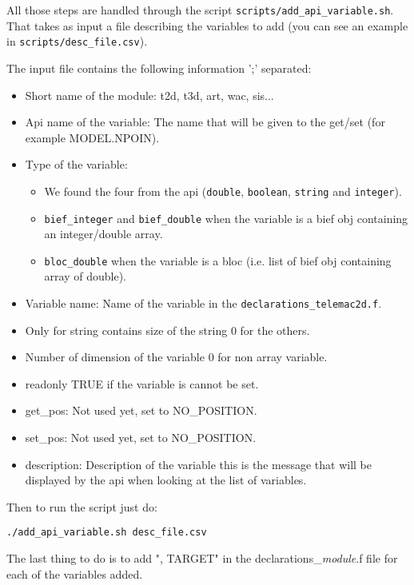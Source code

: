 All those steps are handled through the script
\verb!scripts/add_api_variable.sh!. That takes as input a file describing the
variables to add (you can see an example in \verb!scripts/desc_file.csv!).

The input file contains the following information ';' separated:
\begin{itemize}
  \item Short name of the module: t2d, t3d, art, wac, sis...
  \item Api name of the variable: The name that will be given to the get/set
    (for example MODEL.NPOIN).
  \item Type of the variable:
    \begin{itemize}
      \item We found the four from the api (\verb!double!, \verb!boolean!,
        \verb!string! and \verb!integer!).
      \item \verb!bief_integer! and \verb!bief_double! when the 
        variable is a bief obj containing an integer/double array.
      \item \verb!bloc_double! when the  variable is a bloc (i.e.
        list of bief obj containing array of double).
    \end{itemize}
  \item Variable \fortran name: Name of the variable in the
    \verb!declarations_telemac2d.f!.
  \item Only for string contains size of the string 0 for the others.
  \item Number of dimension of the variable 0 for non array variable.
  \item readonly TRUE if the variable is cannot be set.
  \item get\_pos: Not used yet, set to NO\_POSITION.
  \item set\_pos: Not used yet, set to NO\_POSITION.
  \item description: Description of the variable this is the message that will
    be displayed by the api when looking at the list of variables.
\end{itemize}

Then to run the script just do:
\begin{lstlisting}
./add_api_variable.sh desc_file.csv
\end{lstlisting}

The last thing to do is to add ", TARGET" in the
declarations\_\textit{module}.f file for each of the variables added.

